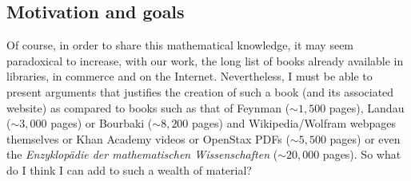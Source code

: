 	\subsection{Motivation and goals}
	Of course, in order to share this mathematical knowledge, it may seem paradoxical to increase, with our work, the long list of books already available in libraries, in commerce and on the Internet. Nevertheless, I must be able to present arguments that justifies the creation of such a book (and its associated website) as compared to books such as that of Feynman ($\sim 1,500$ pages), Landau ($\sim 3,000$ pages) or Bourbaki ($\sim 8,200$ pages) and Wikipedia/Wolfram webpages themselves or Khan Academy videos or OpenStax PDFs ($\sim 5,500$ pages) or even the \textit{Enzyklopädie der mathematischen Wissenschaften} ($\sim 20,000$ pages). So what do I think I can add to such a wealth of material? 
